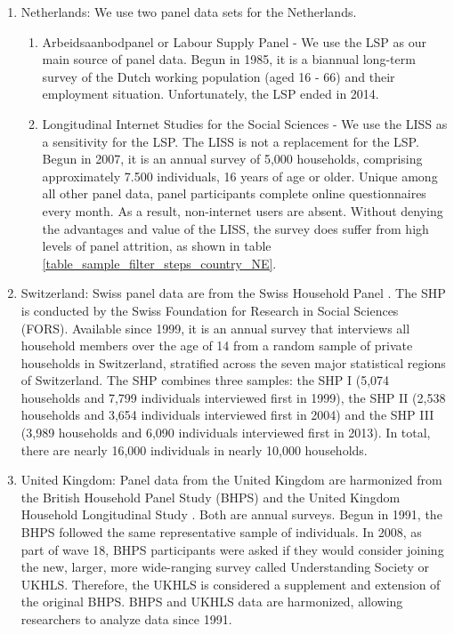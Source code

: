 \begin{enumerate}
    \item Netherlands: We use two panel data sets for the Netherlands.  
    \begin{enumerate}
        \item Arbeidsaanbodpanel or Labour Supply Panel \citep{lsp_arbeidsaanbodpanel_2016} - We use the LSP as our main source of panel data.  Begun in 1985, it is a biannual long-term survey of the Dutch working population (aged 16 - 66) and their employment situation.  Unfortunately, the LSP ended in 2014.
        \item Longitudinal Internet Studies for the Social Sciences \citep{liss_longitudinal_2020} - We use the LISS as a sensitivity for the LSP.  The LISS is not a replacement for the LSP.  Begun in 2007, it is an annual survey of 5,000 households, comprising approximately 7.500 individuals, 16 years of age or older.  Unique among all other panel data, panel participants complete online questionnaires every month.  As a result, non-internet users are absent.  Without denying the advantages and value of the LISS, the survey does suffer from high levels of panel attrition, as shown in table \ref{table_sample_filter_steps_country_NE}.
    \end{enumerate}

    \item Switzerland: Swiss panel data are from the Swiss Household Panel \citep{shp_swiss_2020}.  The SHP is conducted by the Swiss Foundation for Research in Social Sciences (FORS).  Available since 1999, it is an annual survey that interviews all household members over the age of 14 from a random sample of private households in Switzerland, stratified across the seven major statistical regions of Switzerland.  The SHP combines three samples: the SHP I (5,074 households and 7,799 individuals interviewed first in 1999), the SHP II (2,538 households and 3,654 individuals interviewed first in 2004) and the SHP III (3,989 households and 6,090 individuals interviewed first in 2013).  In total, there are nearly 16,000 individuals in nearly 10,000 households.  

    \item United Kingdom: Panel data from the United Kingdom are harmonized from the British Household Panel Study (BHPS) and the United Kingdom Household Longitudinal Study \citep{bhpsukhls_university_2022}.  Both are annual surveys.  Begun in 1991, the BHPS followed the same representative sample of individuals.  In 2008, as part of wave 18, BHPS participants were asked if they would consider joining the new, larger, more wide-ranging survey called Understanding Society or UKHLS.  Therefore, the UKHLS is considered a supplement and extension of the original BHPS.  BHPS and UKHLS data are harmonized, allowing researchers to analyze data since 1991.

\end{enumerate}

